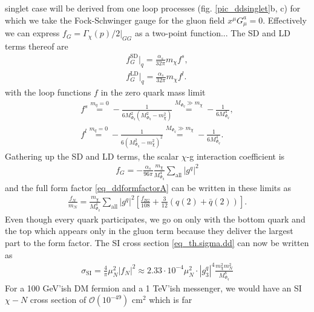 singlet case will be derived from one loop processes (fig. \ref{pic_ddsinglet}b, c) 
for which we take the Fock-Schwinger gauge for the gluon
field $x^\mu G^a_\mu = 0$. Effectively we can express $f_G = \Gamma_\chi(p)/2|_{GG}$ as a two-point function... The SD and LD terms thereof are
\begin{align}
 f_G^\text{SD}|_q = \frac{\alpha_s}{32\pi} m_\chi f^s,\\
 f_G^\text{LD}|_q = \frac{\alpha_s}{32\pi} m_\chi f^l.
\end{align}
with the loop functions $f$ in the zero quark mass limit
\begin{align}
 f^s \stackrel{m_q=0}{=} - \frac{1}{6M_{\Phi_q}^2\left(M_{\Phi_q}^2-m_\chi^2\right)} \stackrel{M_{\Phi_q}\gg m_\chi}{=} -\frac{1}{6M_{\Phi_q}^4},\\
 f^l \stackrel{m_q=0}{=} - \frac{1}{6\left(M_{\Phi_q}^2-m_\chi^2\right)^2}  \stackrel{M_{\Phi_q}\gg m_\chi}{=} -\frac{1}{6M_{\Phi_q}^4}.
\end{align}
Gathering up the SD and LD terms, the scalar $\chi$-g interaction coefficient is
\begin{align}
 f_G = -\frac{\alpha_s}{96\pi} \frac{m_\chi}{M_{\Phi_q}^4} \sum\limits_{\text{all}} |g^q|^2
\end{align}
and the full form factor \eqref{eq_ddformfactorA} can be written in these limits as
\begin{align}
 \frac{f_N}{m_N} = \frac{m_\chi}{M_{\Phi_q}^4} \sum\limits_\text{all} \left|g^q\right|^2 \left[\frac{f_{TG}}{108} + \frac{3}{12}\left(q(2) + \bar q(2)\right)\right].
\end{align}
Even though every quark participates, we go on only with the bottom quark and the top which appears only in the gluon term because they deliver the
largest part to the form factor. The SI cross section \eqref{eq_th.sigma.dd} can now be written as
\begin{align}
 \sigma_\text{SI} = \frac{4}{\pi}\mu_N^2 \left| f_N \right| ^2 \approx 2.33\cdot 10^{-4} \mu_N^2 \cdot |g^q_3|^4 \frac{m_\chi^2 m_N^2}{M_{\Phi_q}^8}
 \label{eq_sigmaDDA}
\end{align}
For a 100 GeV'ish DM fermion and a 1 TeV'ish messenger, we would have an SI $\chi-N$ cross section of $\mathcal{O}(10^{-49})$ cm$^2$ which is far 
